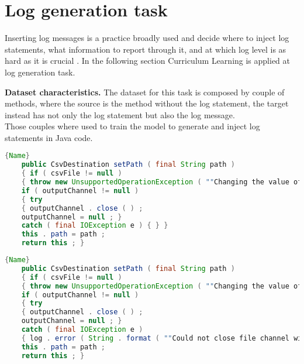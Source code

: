 \section{Log generation task}
Inserting log messages is a practice broadly used and decide where to inject log statements, what information to report through it, 
and at which log level is as hard as it is crucial \cite{Mastropaolo2022}. In the following section Curriculum Learning is applied
at log generation task.

\textbf{Dataset characteristics.} The dataset for this task is composed by couple of methods, where the source is the method without the log statement,
the target instead has not only the log statement but also the log message.\\
Those couples where used to train the model to generate and inject log statements in Java code.


\noindent\begin{minipage}{.45\textwidth}
\begin{lstlisting}[language=Java, caption={Method},label={lst:buggy1}, mathescape=true, breaklines=true]{Name}
    public CsvDestination setPath ( final String path ) 
    { if ( csvFile != null ) 
    { throw new UnsupportedOperationException ( ""Changing the value of path after opening the destination is not allowed."" ) ; } 
    if ( outputChannel != null ) 
    { try 
    { outputChannel . close ( ) ; 
    outputChannel = null ; } 
    catch ( final IOException e ) { } } 
    this . path = path ; 
    return this ; }
\end{lstlisting}
\end{minipage}\hfill
\begin{minipage}{.45\textwidth}
\begin{lstlisting}[language=Java, caption={Method + log statement},label={lst:fixed1}, mathescape=true, breaklines=true]{Name}
    public CsvDestination setPath ( final String path ) 
    { if ( csvFile != null ) 
    { throw new UnsupportedOperationException ( ""Changing the value of path after opening the destination is not allowed."" ) ; } 
    if ( outputChannel != null ) 
    { try 
    { outputChannel . close ( ) ; 
    outputChannel = null ; } 
    catch ( final IOException e ) 
    { log . error ( String . format ( ""Could not close file channel with CSV results for file %s."" , csvFile ) , e ) ; } } 
    this . path = path ; 
    return this ; }
\end{lstlisting}
\end{minipage}

